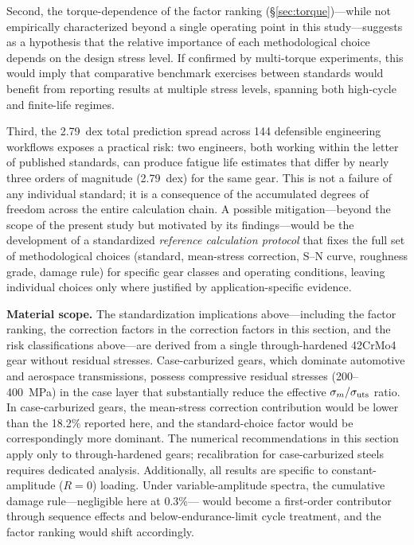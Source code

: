 \documentclass[twocolumn,12pt,a4paper]{article}
\begin{document}
Second, the torque-dependence of the factor ranking
(\S\ref{sec:torque})---while not empirically characterized beyond a
single operating point in this study---suggests as a hypothesis that
the relative importance of each methodological choice depends on the
design stress level. If confirmed by multi-torque experiments, this
would imply that comparative benchmark exercises between standards
would benefit from reporting results at multiple stress levels,
spanning both high-cycle and finite-life regimes.

Third, the 2.79~dex total prediction spread across 144 defensible
engineering workflows exposes a practical risk: two engineers, both
working within the letter of published standards, can produce fatigue
life estimates that differ by nearly three orders of magnitude (2.79~dex) for the same
gear. This is not a failure of any individual standard; it is a
consequence of the accumulated degrees of freedom across the entire
calculation chain. A possible mitigation---beyond the scope of the
present study but motivated by its findings---would be the development
of a standardized \emph{reference calculation protocol} that fixes the
full set of methodological choices (standard, mean-stress correction,
S--N curve, roughness grade, damage rule) for specific gear classes and
operating conditions, leaving individual choices only where justified
by application-specific evidence.

\textbf{Material scope.} The standardization implications
above---including the factor ranking, the correction factors in
the correction factors in this section, and the risk classifications
above---are derived from a single through-hardened
42CrMo4 gear without residual stresses. Case-carburized gears, which
dominate automotive and aerospace transmissions, possess compressive
residual stresses (200--400~MPa) in the case layer that substantially
reduce the effective $\sigma_m/\sigma_{\rm uts}$ ratio. In
case-carburized gears, the mean-stress correction contribution would
be lower than the 18.2\% reported here, and the standard-choice
factor would be correspondingly more dominant. The numerical recommendations in this section apply only to
through-hardened gears; recalibration for case-carburized steels
requires dedicated analysis. Additionally, all results are specific
to constant-amplitude ($R=0$) loading. Under variable-amplitude
spectra, the cumulative damage rule---negligible here at 0.3\%---%
would become a first-order contributor through sequence effects and
below-endurance-limit cycle treatment, and the factor ranking would
shift accordingly.
\end{document}
